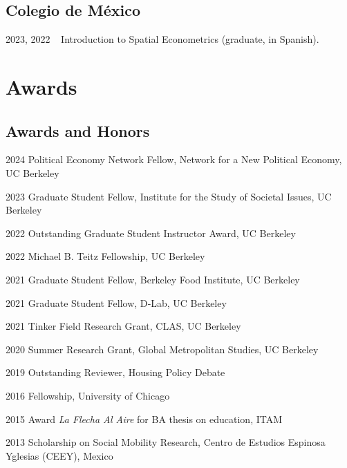 \documentclass[12pt,letterpaper]{report}
\begin{document}
    \subsection*{Colegio de México}
        \begin{tablist}
        \item[2023, 2022] $\>$ $\>$Introduction to Spatial Econometrics (graduate, in Spanish).
    \end{tablist}


    \section*{Awards}
    \subsection*{Awards and Honors}
    \begin{tablist}
        \item[2024] \quad{}Political Economy Network Fellow, Network for a New Political Economy, UC Berkeley 
        \item[2023] \quad{}Graduate Student Fellow, Institute for the Study of Societal Issues, UC Berkeley
        \item[2022] \quad{}Outstanding Graduate Student Instructor Award, UC Berkeley
        \item[2022] \quad{}Michael B. Teitz Fellowship, UC Berkeley 
        \item[2021] \quad{}Graduate Student Fellow, Berkeley Food Institute, UC Berkeley
        \item[2021] \quad{}Graduate Student Fellow, D‐Lab, UC Berkeley
        \item[2021] \quad{}Tinker Field Research Grant, CLAS, UC Berkeley
        \item[2020] \quad{}Summer Research Grant, Global Metropolitan Studies, UC Berkeley
        \item[2019] \quad{}Outstanding Reviewer, Housing Policy Debate
        \item[2016] \quad{}Fellowship, University of Chicago
        \item[2015] \quad{}Award \textit{La Flecha Al Aire} for BA thesis on education, ITAM
        \item[2013] \quad{}Scholarship on Social Mobility Research, Centro de Estudios Espinosa Yglesias (CEEY), Mexico
    \end{tablist}
    

\end{document}
